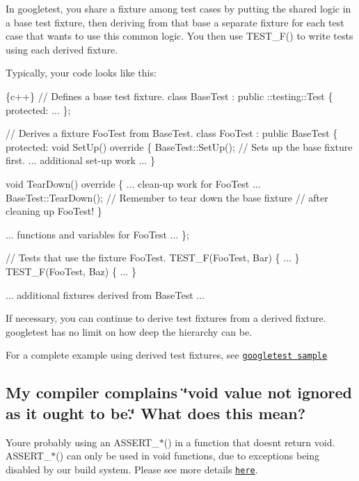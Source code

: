 In googletest, you share a fixture among test cases by putting the shared logic in a base test fixture, then deriving from that base a separate fixture for each test case that wants to use this common logic. You then use {\ttfamily T\+E\+S\+T\+\_\+\+F()} to write tests using each derived fixture.

Typically, your code looks like this\+:


\begin{DoxyCode}
\{c++\}
// Defines a base test fixture.
class BaseTest : public ::testing::Test \{
 protected:
  ...
\};

// Derives a fixture FooTest from BaseTest.
class FooTest : public BaseTest \{
 protected:
  void SetUp() override \{
    BaseTest::SetUp();  // Sets up the base fixture first.
    ... additional set-up work ...
  \}

  void TearDown() override \{
    ... clean-up work for FooTest ...
    BaseTest::TearDown();  // Remember to tear down the base fixture
                           // after cleaning up FooTest!
  \}

  ... functions and variables for FooTest ...
\};

// Tests that use the fixture FooTest.
TEST\_F(FooTest, Bar) \{ ... \}
TEST\_F(FooTest, Baz) \{ ... \}

... additional fixtures derived from BaseTest ...
\end{DoxyCode}


If necessary, you can continue to derive test fixtures from a derived fixture. googletest has no limit on how deep the hierarchy can be.

For a complete example using derived test fixtures, see \href{https://github.com/google/googletest/blob/master/googletest/samples/sample5_unittest.cc}{\tt googletest sample}

\subsection*{My compiler complains \char`\"{}void value not ignored as it ought to be.\char`\"{} What does this mean?}

You\textquotesingle{}re probably using an {\ttfamily A\+S\+S\+E\+R\+T\+\_\+$\ast$()} in a function that doesn\textquotesingle{}t return {\ttfamily void}. {\ttfamily A\+S\+S\+E\+R\+T\+\_\+$\ast$()} can only be used in {\ttfamily void} functions, due to exceptions being disabled by our build system. Please see more details \href{advanced.md#assertion-placement}{\tt here}.

